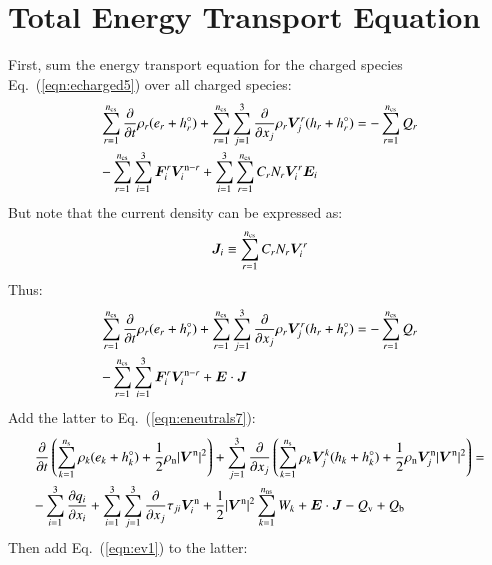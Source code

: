 \documentclass{warpdoc}
\newcommand{\alb}{\vspace{0.1cm}\\} %
\newcommand{\mfd}{\displaystyle}
\newcommand{\ns}{{n_{\rm s}}}
\newcommand{\nns}{{n_{\rm ns}}}
\newcommand{\ncs}{{n_{\rm cs}}}
\renewcommand{\vec}[1]{\bm{#1}}
\begin{document}
\section{Total Energy Transport Equation}

First, sum the energy transport equation for the charged species Eq.\ (\ref{eqn:echarged5}) over all charged species:
%
\begin{equation}
\begin{array}{l}\mfd
\sum_{r=1}^\ncs \frac{\partial }{\partial t}\rho_r (e_r+h_r^\circ) 
+ \sum_{r=1}^\ncs \sum_{j=1}^3  \frac{\partial }{\partial x_j} \rho_r \vec{V}^r_j (h_r+h_r^\circ) 
= 
- \sum_{r=1}^\ncs Q_{r} \alb\mfd
-\sum_{r=1}^\ncs \sum_{i=1}^3 \vec{F}_i^r \vec{V}_i^{{\rm n}-r} 
+ \sum_{i=1}^3 \sum_{r=1}^\ncs  C_r N_r  \vec{V}^r_i \vec{E}_i
\end{array}
\end{equation}
%  
But note that the current density can be expressed as:
%
\begin{equation}
 \vec{J}_i \equiv \sum_{r=1}^\ncs  C_r N_r  \vec{V}^r_i
\end{equation}
%
Thus:
%
\begin{equation}
\begin{array}{l}\mfd
\sum_{r=1}^\ncs \frac{\partial }{\partial t}\rho_r (e_r+h_r^\circ) 
+ \sum_{r=1}^\ncs \sum_{j=1}^3  \frac{\partial }{\partial x_j} \rho_r \vec{V}^r_j (h_r+h_r^\circ) 
= 
- \sum_{r=1}^\ncs Q_{r}\alb\mfd
-\sum_{r=1}^\ncs \sum_{i=1}^3 \vec{F}_i^r \vec{V}_i^{{\rm n}-r} 
+ \vec{E}\cdot\vec{J}
\end{array}
\end{equation}
%  
Add the latter to Eq.\ (\ref{eqn:eneutrals7}):
%
\begin{equation}
\begin{array}{l}\mfd
 \frac{\partial }{\partial t}\left(\sum_{k=1}^\ns \rho_k (e_k+h_k^\circ)+\frac{1}{2}\rho_{\rm n}|\vec{V}^{\rm n}|^2 \right) 
+ \sum_{j=1}^3  \frac{\partial }{\partial x_j} \left(\sum_{k=1}^\ns \rho_k \vec{V}^k_j (h_k+h_k^\circ)+\frac{1}{2}\rho_{\rm n}\vec{V}^{\rm n}_j|\vec{V}^{\rm n}|^2 \right)
= \alb\mfd
-\sum_{i=1}^{3}\frac{\partial q_i}{\partial x_i}
+\sum_{i=1}^3 \sum_{j=1}^3  \frac{\partial }{\partial x_j} \tau_{ji} \vec{V}_i^{\rm n}
+\frac{1}{2}|\vec{V}^{\rm n}|^2 \sum_{k=1}^\nns W_k
+ \vec{E}\cdot\vec{J}
-  Q_{\rm v}
+ Q_{\rm b}
\end{array}
\end{equation}
%  
Then add Eq.\ (\ref{eqn:ev1}) to the latter:
%
\end{document}
